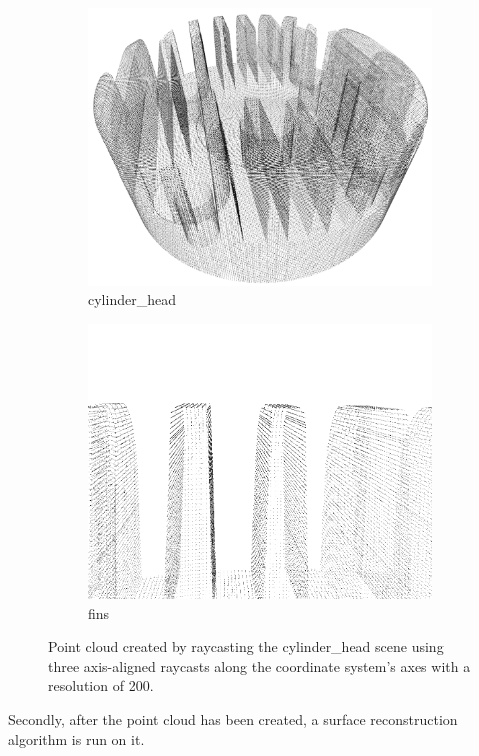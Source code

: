 \begin{figure}
	\centering
	\begin{subfigure}[t]{0.49\textwidth}
		\centering
		\includegraphics[width=\textwidth]{images/cylinder_head_point_cloud}
		\caption{cylinder\_head}
		\label{fig:cylinder_head_point_cloud_}
	\end{subfigure}
	\begin{subfigure}[t]{0.49\textwidth}
		\centering
		\includegraphics[width=\textwidth]{images/cylinder_head_point_cloud_fins}
		\caption{fins}
		\label{fig:cylinder_head_point_cloud_fins}
	\end{subfigure}
	\caption{
		Point cloud created by raycasting the cylinder\_head scene using three axis-aligned raycasts along the coordinate system's axes with a resolution of 200.
	}
	\label{fig:cylinder_head_point_cloud}
\end{figure}
%
Secondly, after the point cloud has been created, a surface reconstruction algorithm is run on it.

